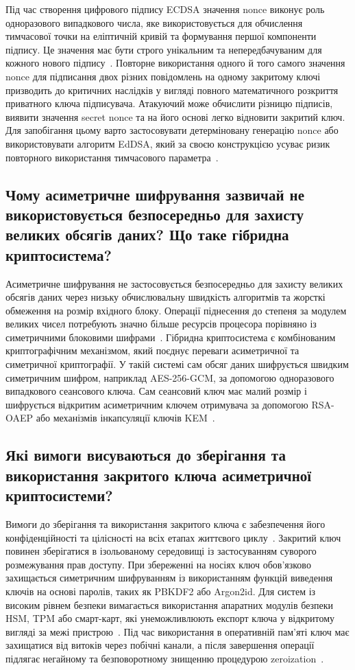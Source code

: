 Під час створення цифрового підпису ECDSA значення nonce виконує роль одноразового випадкового числа,
яке використовується для обчислення тимчасової точки на еліптичній кривій та формування першої
компоненти підпису. Це значення має бути строго унікальним та непередбачуваним для кожного нового
підпису~\cite{RFC6979}. Повторне використання одного й того самого значення nonce для підписання двох
різних повідомлень на одному закритому ключі призводить до критичних наслідків у вигляді повного
математичного розкриття приватного ключа підписувача. Атакуючий може обчислити різницю підписів,
виявити значення secret nonce та на його основі легко відновити закритий ключ. Для запобігання цьому варто
застосовувати детерміновану генерацію nonce або використовувати алгоритм EdDSA, який за своєю
конструкцією усуває ризик повторного використання тимчасового
параметра~\cite{RFC6979,RFC8032,cryptography}.

\subsection{Чому асиметричне шифрування зазвичай не використовується безпосередньо для захисту великих обсягів даних? Що таке гібридна криптосистема?}

Асиметричне шифрування не застосовується безпосередньо для захисту великих обсягів даних через низьку
обчислювальну швидкість алгоритмів та жорсткі обмеження на розмір вхідного блоку. Операції піднесення
до степеня за модулем великих чисел потребують значно більше ресурсів процесора порівняно із
симетричними блоковими шифрами~\cite{NIST80057}. Гібридна криптосистема є комбінованим
криптографічним механізмом, який поєднує переваги асиметричної та симетричної криптографії. У такій
системі сам обсяг даних шифрується швидким симетричним шифром, наприклад AES-256-GCM, за допомогою
одноразового випадкового сеансового ключа. Сам сеансовий ключ має малий розмір і шифрується відкритим
асиметричним ключем отримувача за допомогою RSA-OAEP або механізмів інкапсуляції ключів
KEM~\cite{NIST80057,RFC8017}.


\subsection{Які вимоги висуваються до зберігання та використання закритого ключа асиметричної криптосистеми?}

Вимоги до зберігання та використання закритого ключа є забезпечення його конфіденційності та цілісності на
всіх етапах життєвого циклу~\cite{NIST80057,FIPS1403}. Закритий ключ повинен зберігатися в ізольованому
середовищі із застосуванням суворого розмежування прав доступу. При збереженні на носіях ключ
обов'язково захищається симетричним шифруванням із використанням функцій виведення ключів на основі
паролів, таких як PBKDF2 або Argon2id. Для систем із високим рівнем безпеки вимагається використання
апаратних модулів безпеки HSM, TPM або смарт-карт, які унеможливлюють експорт ключа у відкритому
вигляді за межі пристрою~\cite{FIPS1403}. Під час використання в оперативній пам'яті ключ має захищатися
від витоків через побічні канали, а після завершення операції підлягає негайному та безповоротному
знищенню процедурою zeroization~\cite{NIST80057,FIPS1403}.
